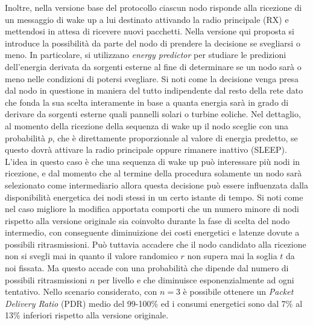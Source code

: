 \documentclass[binding=0.6cm,TFA]{sapthesis}
\begin{document}
Inoltre, nella versione base del protocollo ciascun nodo risponde alla ricezione di un messaggio di wake up a lui destinato attivando la radio principale (RX) e mettendosi
in attesa di ricevere nuovi pacchetti. Nella versione qui proposta si introduce la possibilità da parte del nodo di prendere la decisione se svegliarsi o meno.
In particolare, si utilizzano \emph{energy predictor} per studiare le predizioni dell'energia derivata da sorgenti esterne al fine di determinare se un nodo sarà o
meno nelle condizioni di potersi svegliare. Si noti come la decisione venga presa dal nodo in questione in maniera del tutto indipendente dal resto della rete dato
che fonda la sua scelta interamente in base a quanta energia sarà in grado di derivare da sorgenti esterne quali pannelli solari o turbine eoliche. Nel dettaglio,
al momento della ricezione della sequenza di wake up il nodo sceglie con una probabilità $p$, che è direttamente proporzionale al valore di energia predetto,
se questo dovrà attivare la radio principale oppure rimanere inattivo (SLEEP). L'idea in questo caso è che una sequenza di wake up può interessare più nodi
in ricezione, e dal momento che al termine della procedura solamente un nodo sarà selezionato come intermediario allora questa decisione può essere influenzata dalla
disponibilità energetica dei nodi stessi in un certo istante di tempo. Si noti come nel caso migliore la modifica apportata comporti che un numero minore di nodi
rispetto alla versione originale sia coinvolto durante la fase di scelta del nodo intermedio, con conseguente diminuizione dei costi energetici e latenze dovute a
possibili ritrasmissioni. Può tuttavia accadere che il nodo candidato alla ricezione non si svegli mai in quanto il valore randomico $r$ non supera mai la
soglia $t$ da noi fissata. Ma questo accade con una probabilità che dipende dal numero di possibili ritrasmissioni $n$ per livello e che diminuisce esponenzialmente
ad ogni tentativo. Nello scenario considerato, con $n=3$ è possibile ottenere un \emph{Packet Delivery Ratio} (PDR) medio del 99-100\% ed i consumi
energetici sono dal 7\% al 13\% inferiori rispetto alla versione originale.\\
\end{document}
